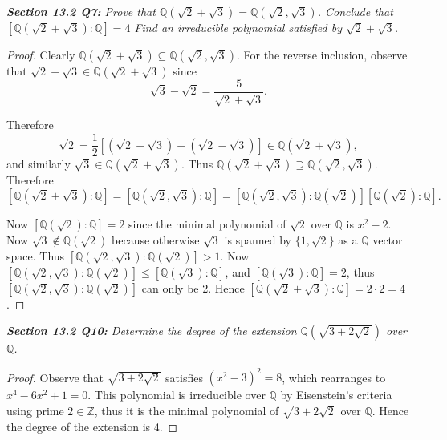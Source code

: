 \documentclass{article}
\begin{document}
\it \textbf{Section 13.2 Q7:} Prove that $\mathbb{Q}(\sqrt{2}+\sqrt{3})
  =\mathbb{Q}(\sqrt{2},\sqrt{3})$. Conclude that
  $[\mathbb{Q}(\sqrt{2}+\sqrt{3}):\mathbb{Q}]=4$ Find an irreducible
  polynomial satisfied by $\sqrt{2}+\sqrt{3}$.

  \begin{proof}
    Clearly $\mathbb{Q}(\sqrt{2}+\sqrt{3})
    \subseteq\mathbb{Q}(\sqrt{2},\sqrt{3})$. For the reverse inclusion,
    observe that $\sqrt{2}-\sqrt{3} \in\mathbb{Q}(\sqrt{2}+\sqrt{3})$ since
    \[\sqrt{3}-\sqrt{2} =\frac{5}{\sqrt{2}+\sqrt{3}}.\]

    Therefore
    \[\sqrt{2} =\frac{1}{2} [(\sqrt{2}+\sqrt{3}) +(\sqrt{2}-\sqrt{3})]
    \in\mathbb{Q}(\sqrt{2}+\sqrt{3}),\]
    and similarly $\sqrt{3} \in\mathbb{Q}(\sqrt{2}+\sqrt{3})$. Thus
    $\mathbb{Q}(\sqrt{2}+\sqrt{3}) \supseteq\mathbb{Q}(\sqrt{2},\sqrt{3})$.
    \\

    Therefore
    \[[\mathbb{Q}(\sqrt{2}+\sqrt{3}):\mathbb{Q}]
    =[\mathbb{Q}(\sqrt{2},\sqrt{3}):\mathbb{Q}]
    =[\mathbb{Q}(\sqrt{2},\sqrt{3}):\mathbb{Q}(\sqrt{2})]
    [\mathbb{Q}(\sqrt{2}):\mathbb{Q}].\]

    Now $[\mathbb{Q}(\sqrt{2}):\mathbb{Q}]=2$ since the minimal polynomial
    of $\sqrt{2}$ over $\mathbb{Q}$ is $x^2-2$. Now
    $\sqrt{3}\not\in\mathbb{Q}(\sqrt{2})$ because otherwise $\sqrt{3}$ is
    spanned by $\{1,\sqrt{2}\}$ as a $\mathbb{Q}$ vector space. Thus
    $[\mathbb{Q}(\sqrt{2},\sqrt{3}):\mathbb{Q}(\sqrt{2})] >1$. Now
    $[\mathbb{Q}(\sqrt{2},\sqrt{3}):\mathbb{Q}(\sqrt{2})]
    \leq[\mathbb{Q}(\sqrt{3}):\mathbb{Q}]$, and
    $[\mathbb{Q}(\sqrt{3}):\mathbb{Q}]=2$, thus
    $[\mathbb{Q}(\sqrt{2},\sqrt{3}):\mathbb{Q}(\sqrt{2})]$ can only be 2.
    Hence $[\mathbb{Q}(\sqrt{2}+\sqrt{3}):\mathbb{Q}]=2\cdot2=4$.
  \end{proof}

\it \textbf{Section 13.2 Q10:} Determine the degree of the extension
  $\mathbb{Q}(\sqrt{3+2\sqrt{2}})$ over $\mathbb{Q}$.

  \begin{proof}
    Observe that $\sqrt{3+2\sqrt{2}}$ satisfies $(x^2-3)^2=8$, which
    rearranges to $x^4-6x^2+1=0$. This polynomial is irreducible over
    $\mathbb{Q}$ by Eisenstein's criteria using prime $2\in\mathbb{Z}$,
    thus it is the minimal polynomial of $\sqrt{3+2\sqrt{2}}$ over
    $\mathbb{Q}$. Hence the degree of the extension is 4.
  \end{proof}
\end{document}
